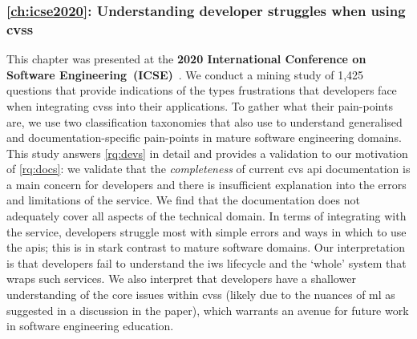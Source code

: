 \subsubsection{\cref{ch:icse2020}: Understanding developer struggles when using \glspl{cvs}} This chapter was presented at the \textbf{2020 International Conference on Software Engineering~(ICSE)}~\citep{Cummaudo:2020icse}. We conduct a mining study of 1,425  questions that provide indications of the types frustrations that developers face when integrating \glspl{cvs} into their applications. To gather what their pain-points are, we use two classification taxonomies that also use  to understand generalised and documentation-specific pain-points in mature software engineering domains. This study answers \ref{rq:devs} in detail and provides a validation to our motivation of \ref{rq:docs}: we validate that the \textit{completeness} of current \gls{cvs} \gls{api} documentation is a main concern for developers and there is insufficient explanation into the errors and limitations of the service. We find that the documentation does not adequately cover all aspects of the technical domain. In terms of integrating with the service, developers struggle most with simple errors and ways in which to use the \glspl{api}; this is in stark contrast to mature software domains. Our interpretation is that developers fail to understand the \gls{iws} lifecycle and the `whole' system that wraps such services. We also interpret that developers have a shallower understanding of the core issues within \glspl{cvs} (likely due to the nuances of \gls{ml} as suggested in a discussion in the paper), which warrants an avenue for future work in software engineering education.

